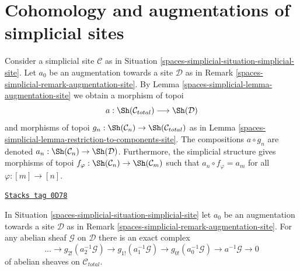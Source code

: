 \section{Cohomology and augmentations of simplicial sites}
\label{spaces-simplicial-section-cohomology-augmentation-simplicial-sites}
Consider a simplicial site $\mathcal{C}$ as in
Situation \ref{spaces-simplicial-situation-simplicial-site}.
Let $a_0$ be an augmentation towards a site $\mathcal{D}$ as in
Remark \ref{spaces-simplicial-remark-augmentation-site}.
By Lemma \ref{spaces-simplicial-lemma-augmentation-site} we obtain a morphism of topoi
$$
a : \Sh(\mathcal{C}_{total}) \longrightarrow \Sh(\mathcal{D})
$$
and morphisms of topoi
$g_n : \Sh(\mathcal{C}_n) \to \Sh(\mathcal{C}_{total})$
as in Lemma \ref{spaces-simplicial-lemma-restriction-to-components-site}.
The compositions $a \circ g_n$ are denoted
$a_n : \Sh(\mathcal{C}_n) \to \Sh(\mathcal{D})$.
Furthermore, the simplicial structure gives
morphisms of topoi
$f_\varphi : \Sh(\mathcal{C}_n) \to \Sh(\mathcal{C}_m)$
such that $a_n \circ f_\varphi = a_m$ for all $\varphi : [m] \to [n]$.

\begin{lemma}
\label{spaces-simplicial-lemma-simplicial-resolution-augmentation}
\href{https://stacks.math.columbia.edu/tag/0D78}{\texttt{Stacks tag 0D78}}

In Situation \ref{spaces-simplicial-situation-simplicial-site} let
$a_0$ be an augmentation towards a site $\mathcal{D}$
as in Remark \ref{spaces-simplicial-remark-augmentation-site}.
For any abelian sheaf $\mathcal{G}$ on $\mathcal{D}$
there is an exact complex
$$
\ldots \to
g_{2!}(a_2^{-1}\mathcal{G}) \to
g_{1!}(a_1^{-1}\mathcal{G}) \to
g_{0!}(a_0^{-1}\mathcal{G}) \to
a^{-1}\mathcal{G} \to 0
$$
of abelian sheaves on $\mathcal{C}_{total}$.
\end{lemma}

